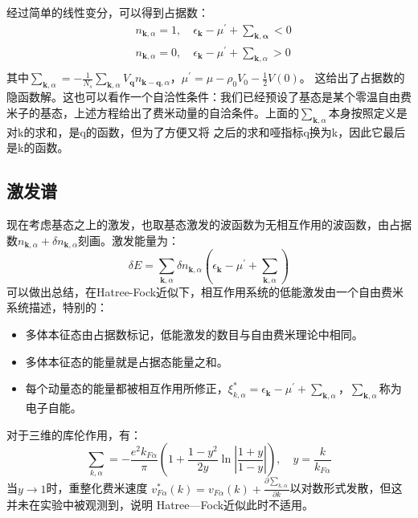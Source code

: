 \documentclass[10pt,openany]{book}
\theoremstyle{thmstyle} %
\theoremstyle{defstyle} %
\theoremstyle{prostyle} %
\begin{document}
经过简单的线性变分，可以得到占据数：
\begin{equation}
  \begin{aligned}
    & n_{\mathbf{k}, \alpha}=1, \quad \epsilon_{\mathbf{k}}-\mu^{\prime}+\sum_{\mathbf{k}, \mathbf{\alpha}}<0 \\
    & n_{\mathbf{k}, \alpha}=0, \quad \epsilon_{\mathbf{k}}-\mu^{\prime}+\sum_{\mathbf{k}, \alpha}>0 \\
    &
    \end{aligned}
\end{equation}
其中$ \sum_{\mathbf{k}, \alpha}=-\frac{1}{N_s} \sum_{\mathbf{k}, \alpha} V_{\mathbf{q}} n_{\mathbf{k}-\mathbf{q}, \alpha} $，$ \mu^{\prime}=\mu-\rho_0 V_0-\frac{1}{2} V(0) $。
这给出了占据数的隐函数解。这也可以看作一个自洽性条件：我们已经预设了基态是某个零温自由费米子的基态，上述方程给出了费米动量的自洽条件。上面的$ \sum_{\mathbf{k}, \alpha} $本身按照定义是对k的求和，是q的函数，但为了方便又将
之后的求和哑指标q换为k，因此它最后是k的函数。 

\subsection{激发谱} 
现在考虑基态之上的激发，也取基态激发的波函数为无相互作用的波函数，由占据数$ n_{\mathbf{k}, \alpha}+\delta n_{\mathbf{k}, \alpha} $刻画。激发能量为：
\begin{equation}
  \delta E=\sum_{\mathbf{k}, \alpha} \delta n_{\mathbf{k}, \alpha}\left(\epsilon_{\mathbf{k}}-\mu^{\prime}+\sum_{\mathbf{k}, \alpha}\right)
\end{equation} 
可以做出总结，在Hatree-Fock近似下，相互作用系统的低能激发由一个自由费米系统描述，特别的：
\begin{itemize}
  \item 多体本征态由占据数标记，低能激发的数目与自由费米理论中相同。
  \item 多体本征态的能量就是占据态能量之和。
  \item 每个动量态的能量都被相互作用所修正，$ \xi_{k, \alpha}^*=\epsilon_{\mathbf{k}}-\mu^{\prime}+\sum_{\mathbf{k}, \alpha} $，$ \sum_{\mathbf{k}, \alpha} $称为电子自能。  
\end{itemize}
对于三维的库伦作用，有：
\begin{equation}
  \sum_{k, \alpha}=-\frac{e^2 k_{F \alpha}}{\pi}\left(1+\frac{1-y^2}{2 y} \ln \left|\frac{1+y}{1-y}\right|\right), \quad y=\frac{k}{k_{F \alpha}}
\end{equation}
当$ y\to 1 $时，重整化费米速度 $ v_{F \alpha}^*(k)=v_{F \alpha}(k)+\frac{\partial \sum_{k, \alpha}}{\partial k} $以对数形式发散，但这并未在实验中被观测到，说明
Hatree—Fock近似此时不适用。 
\end{document}
